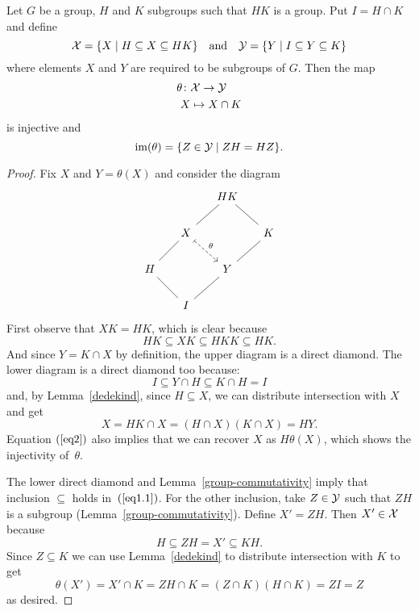 \begin{cor}
    Let $G$ be a group, $H$ and $K$ subgroups such that $HK$ is a group. Put $I=H\cap K$ and define
    $$
        {\cal X} = \{X \mid H\subseteq X\subseteq HK\}
        \quad{\rm and}\quad
        {\cal Y} = \{Y\mid I\subseteq Y\subseteq K\}
    $$
    where elements $X$ and $Y$ are required to be subgroups of\/ $G$.
    Then the map
    \begin{align*}
        \theta\colon&{\cal X}\to{\cal Y}\\
        X&\mapsto X\cap K
    \end{align*}
    is injective and
    \begin{equation}\label{eq1.1}
        \operatorname{im}(\theta) = \{Z \in {\cal Y} \mid ZH=HZ\}.
    \end{equation}
\end{cor}

\begin{proof} Fix $X$ and $Y=\theta(X)$ and consider the diagram
$$
    \begin{tikzcd}[column sep=0.5cm]
            &&HK
                \arrow[rd,no head]
                \arrow[ld,no head]\\
            &X
                \arrow[ld,no head]
                \arrow[rd,"\theta",dashed,maps to]
            &&K
                \arrow[ld,no head]\\
        H
                \arrow[rd,no head]
            &&Y
                \arrow[ld,no head]\\
            &I
\end{tikzcd}
$$
First observe that $XK=HK$, which is clear because
$$
    HK\subseteq XK \subseteq HKK\subseteq HK.
$$
And since $Y=K\cap X$ by definition, the upper diagram is a direct diamond. The lower diagram is a direct diamond too because:
$$
    I \subseteq Y\cap H\subseteq K\cap H= I
$$
and, by Lemma~\ref{dedekind}, since $H\subseteq X$, we can distribute intersection with $X$ and get
\begin{equation}\label{eq2}
    X = HK\cap X = (H\cap X)(K\cap X) = HY.
\end{equation}
Equation $(\ref{eq2})$ also implies that we can recover $X$ as $H\theta(X)$, which shows the injectivity of~$\theta$.

The lower direct diamond and Lemma~\ref{group-commutativity} imply that inclusion $\subseteq$ holds in~$(\ref{eq1.1})$. For the other inclusion, take $Z\in{\cal Y}$ such that $ZH$ is a subgroup (Lemma~\ref{group-commutativity}). Define $X'=ZH$. Then $X'\in{\cal X}$ because
$$
    H \subseteq ZH = X' \subseteq KH.
$$
Since $Z\subseteq K$ we can use Lemma~\ref{dedekind} to distribute intersection with $K$ to get
$$
    \theta(X')= X'\cap K = ZH\cap K = (Z\cap K)(H\cap K) = ZI = Z
$$
as desired.  \end{proof}

